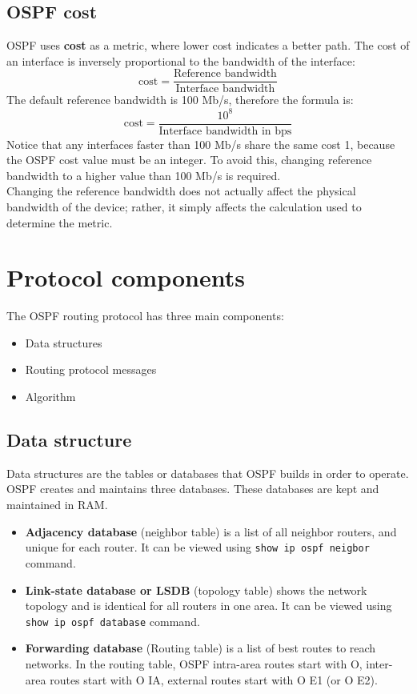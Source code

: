 \subsection{OSPF cost}

OSPF uses \textbf{cost} as a metric, where lower cost indicates a better path. The cost of an interface is inversely proportional to the bandwidth of the interface:
\[ \text{cost}=\frac{\text{Reference bandwidth}}{\text{Interface bandwidth}} \]
The default reference bandwidth is 100 Mb/s, therefore the formula is:
\[ \text{cost}=\frac{10^8}{\text{Interface bandwidth in bps}} \]
Notice that any interfaces faster than 100 Mb/s share the same cost 1, because the OSPF cost value must be an integer. To avoid this, changing reference bandwidth to a higher value than 100 Mb/s is required. \\

\note Changing the reference bandwidth does not actually affect the physical bandwidth of the device; rather, it simply affects the calculation used to determine the metric.

\section{Protocol components}
The OSPF routing protocol has three main components:
\begin{itemize}
	\item Data structures
	\item Routing protocol messages
	\item Algorithm
	\end{itemize}
	
\subsection{Data structure}

Data structures are the tables or databases that OSPF builds in order to operate. OSPF creates and maintains three databases. These databases are kept and maintained in RAM.

\begin{itemize}
	\item \textbf{Adjacency database} (neighbor table) is a list of all neighbor routers, and unique for each router. It can be viewed using \texttt{show ip ospf neigbor} command.
	\item \textbf{Link-state database or LSDB} (topology table) shows the network topology and is identical for all routers in one area. It can be viewed using \texttt{show ip ospf database} command.
	\item \textbf{Forwarding database} (Routing table) is a list of best routes to reach networks. In the routing table, OSPF intra-area routes start with O, inter-area routes start with O IA, external routes start with O E1 (or O E2).
\end{itemize}

